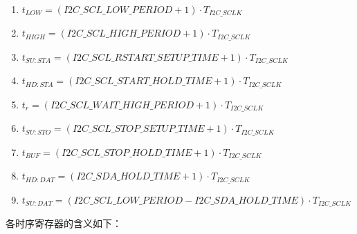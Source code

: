 \documentclass[main\_\_CN.tex]{subfiles}
\begin{document}
\begin{enumerate}
\item  $t_{LOW} = (\hyperref[fielddesc:I2CSCLLOWPERIOD]{I2C\_SCL\_LOW\_PERIOD} + 1) \cdot  T_{I2C\_SCLK}$

\item  $t_{HIGH} = (\hyperref[fielddesc:I2CSCLHIGHPERIOD]{I2C\_SCL\_HIGH\_PERIOD} + 1) \cdot  T_{I2C\_SCLK}$

\item  $t_{SU:STA} = (\hyperref[fielddesc:I2CSCLRSTARTSETUPTIME]{I2C\_SCL\_RSTART\_SETUP\_TIME} + 1) \cdot  T_{I2C\_SCLK}$

\item  $t_{HD:STA} = (\hyperref[fielddesc:I2CSCLSTARTHOLDTIME]{I2C\_SCL\_START\_HOLD\_TIME} +1) \cdot  T_{I2C\_SCLK}$

\item  $t_{r} = (\hyperref[fielddesc:I2CSCLWAITHIGHPERIOD]{I2C\_SCL\_WAIT\_HIGH\_PERIOD} + 1 ) \cdot  T_{I2C\_SCLK}$

\item  $t_{SU:STO} = (\hyperref[fielddesc:I2CSCLSTOPSETUPTIME]{I2C\_SCL\_STOP\_SETUP\_TIME}  + 1) \cdot  T_{I2C\_SCLK}$

\item  $t_{BUF} = (\hyperref[fielddesc:I2CSCLSTOPHOLDTIME]{I2C\_SCL\_STOP\_HOLD\_TIME}  + 1) \cdot  T_{I2C\_SCLK}$

\item  $t_{HD:DAT} = (\hyperref[fielddesc:I2CSDAHOLDTIME]{I2C\_SDA\_HOLD\_TIME} +1) \cdot  T_{I2C\_SCLK}$

\item  $t_{SU:DAT} = (\hyperref[fielddesc:I2CSCLLOWPERIOD]{I2C\_SCL\_LOW\_PERIOD} - \hyperref[fielddesc:I2CSDAHOLDTIME]{I2C\_SDA\_HOLD\_TIME}) \cdot  T_{I2C\_SCLK}$
\end{enumerate}

各时序寄存器的含义如下：
\end{document}
